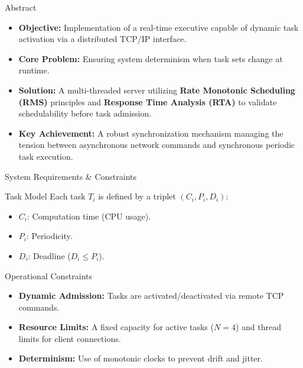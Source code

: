 \begin{frame}{Abstract}
    \begin{itemize}
        \item \textbf{Objective:} Implementation of a real-time executive capable of dynamic task activation via a distributed TCP/IP interface.
        \item \textbf{Core Problem:} Ensuring system determinism when task sets change at runtime.
        \item \textbf{Solution:} A multi-threaded server utilizing \textbf{Rate Monotonic Scheduling (RMS)} principles and \textbf{Response Time Analysis (RTA)} to validate schedulability before task admission.
        \item \textbf{Key Achievement:} A robust synchronization mechanism managing the tension between asynchronous network commands and synchronous periodic task execution.
    \end{itemize}
\end{frame}

\begin{frame}{System Requirements \& Constraints}
    \begin{block}{Task Model}
        Each task $T_i$ is defined by a triplet $(C_i, P_i, D_i)$:
        \begin{itemize}
            \item $C_i$: Computation time (CPU usage).
            \item $P_i$: Periodicity.
            \item $D_i$: Deadline ($D_i \leq P_i$).
        \end{itemize}
    \end{block}
    \begin{block}{Operational Constraints}
        \begin{itemize}
            \item \textbf{Dynamic Admission:} Tasks are activated/deactivated via remote TCP commands.
            \item \textbf{Resource Limits:} A fixed capacity for active tasks ($N=4$) and thread limits for client connections.
            \item \textbf{Determinism:} Use of monotonic clocks to prevent drift and jitter.
        \end{itemize}
    \end{block}
\end{frame}

